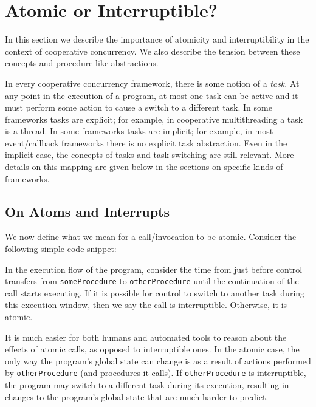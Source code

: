 \documentclass[a4paper,UKenglish,cleveref, autoref]{lipics-v2019}
\begin{document}
\section{Atomic or Interruptible?}

In this section we describe the importance of atomicity and interruptibility in the context of cooperative concurrency.
We also describe the tension between these concepts and procedure-like abstractions.

In every cooperative concurrency framework, there is some notion of a \emph{task}.
At any point in the execution of a program, at most one task can be active and it must perform some action to cause a switch to a different task.
In some frameworks tasks are explicit; for example, in cooperative multithreading a task is a thread.
In some frameworks tasks are implicit; for example, in most event/callback frameworks there is no explicit task abstraction.
Even in the implicit case, the concepts of tasks and task switching are still relevant.
More details on this mapping are given below in the sections on specific kinds of frameworks.

\subsection{On Atoms and Interrupts}

We now define what we mean for a call/invocation to be atomic.
Consider the following simple code snippet\footnotemark{}:

\noindent


In the execution flow of the program, consider the time from just before control transfers from \texttt{someProcedure} to \texttt{otherProcedure} until the continuation of the call starts executing.
If it is possible for control to switch to another task during this execution window, then we say the call is interruptible.
Otherwise, it is atomic.

It is much easier for both humans and automated tools to reason about the effects of atomic calls, as opposed to interruptible ones.
In the atomic case, the only way the program's global state can change is as a result of actions performed by \texttt{otherProcedure} (and procedures it calls).
If \texttt{otherProcedure} is interruptible, the program may switch to a different task during its execution, resulting in changes to the program's global state that are much harder to predict.
\end{document}
